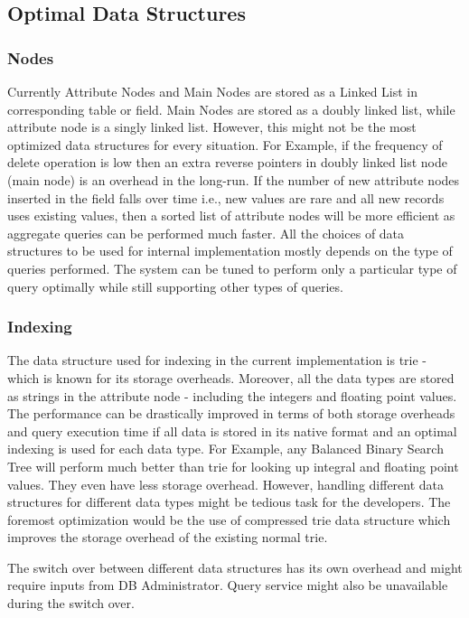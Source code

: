 \documentclass[12pt, oneside]{book}
\begin{document}
\subsection{Optimal Data Structures}
\subsubsection{Nodes}
Currently Attribute Nodes and Main Nodes are stored as a Linked List in corresponding table or field. Main Nodes are stored as a doubly linked list, while attribute node is a singly linked list. However, this might not be the most optimized data structures for every situation. For Example, if the frequency of delete operation is low then an extra reverse pointers in doubly linked list node (main node) is an overhead in the long-run. If the number of new attribute nodes inserted in the field falls over time i.e., new values are rare and all new records uses existing values, then a sorted list of attribute nodes will be more efficient as aggregate queries can be performed much faster. All the choices of data structures to be used for internal implementation mostly depends on the type of queries performed. The system can be tuned to perform only a particular type of query optimally while still supporting other types of queries.
\subsubsection{Indexing}
The data structure used for indexing in the current implementation is trie - which is known for its storage overheads. Moreover, all the data types are stored as strings in the attribute node - including the integers and floating point values. The performance can be drastically improved in terms of both storage overheads and query execution time if all data is stored in its native format and an optimal indexing is used for each data type. For Example, any Balanced Binary Search Tree will perform much better than trie for looking up integral and floating point values. They even have less storage overhead. However, handling different data structures for different data types might be tedious task for the developers. The foremost optimization would be the use of compressed trie data structure which improves the storage overhead of the existing normal trie. \\ \par
The switch over between different data structures has its own overhead and might require inputs from DB Administrator. Query service might also be unavailable during the switch over.
\end{document}
